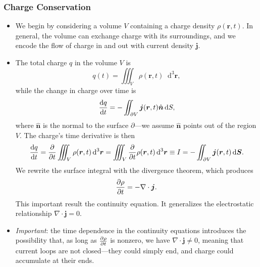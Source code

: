 \documentclass[11pt, a4paper]{article}
\newcommand{\diff}{\mathop{}\!\mathrm{d}} %
\newcommand{\dr}{\diff^{3} \r}  %
\renewcommand{\vec}[1]{\bm{#1}} %
\newcommand{\uvec}[1]{\hat{\vec{#1}}} %
\renewcommand{\r}{\vec{r}}
\renewcommand{\j}{\vec{j}}  %
\renewcommand{\div}{\nabla \cdot}
\begin{document}
\subsubsection{Charge Conservation}
\begin{itemize}
	\item We begin by considering a volume $ V $ containing a charge density $ \rho(\r, t) $. In general, the volume can exchange charge with its surroundings, and we encode the flow of charge in and out with current density $ \j $.
	
	\item The total charge $ q $ in the volume $ V $ is
	\begin{equation*}
		q(t) = \iiint_{V}\rho(\r, t)\dr,
	\end{equation*}
	while the change in charge over time is
	\begin{equation*}
		\dv{q}{t} = - \iint_{\partial V} \j(\r, t)\uvec{n}\diff S,
	\end{equation*}
	where $ \uvec{n} $ is the normal to the surface $ \partial $---we assume $ \uvec{n} $ points out of the region $ V $. The charge's time derivative is then
	\begin{equation*}
		\dv{q}{t} = \pdv{t}\iiint_{V} \rho(\r, t)\dr = \iiint_{V} \pdv{t}\rho(\r, t)\dr \equiv I = - \iint_{\partial V} \j(\r, t)\diff \vec{S}.
	\end{equation*}
	We rewrite the surface integral with the divergence theorem, which produces
	\begin{equation*}
		\pdv{\rho}{t} = - \div \j.
	\end{equation*}
	This important result the continuity equation. It generalizes the electrostatic relationship $ \div \j = 0 $.
	
	\item \textit{Important}: the time dependence in the continuity equations introduces the possibility that, as long as $ \pdv{\rho}{t} $ is nonzero, we have $ \div \j \neq 0 $, meaning that current loops are not closed---they could simply end, and charge could accumulate at their ends. 
\end{itemize}
\end{document}
